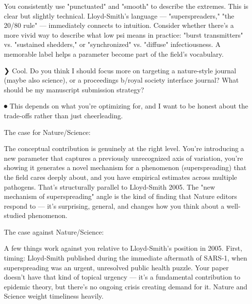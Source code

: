   You consistently use "punctuated" and "smooth" to describe the extremes. This is clear but slightly
   technical. Lloyd-Smith's language --- "superspreaders," "the 20/80 rule" --- immediately connects
  to intuition. Consider whether there's a more vivid way to describe what low psi means in practice:
   "burst transmitters" vs. "sustained shedders," or "synchronized" vs. "diffuse" infectiousness. A
  memorable label helps a parameter become part of the field's vocabulary.



































  ❯ Cool. Do you think I should focus more on targeting a nature-style journal (maybe also
  science), or a proceedings b/royal society interface journal? What should be my manuscript
  submission strategy?

⏺ This depends on what you're optimizing for, and I want to be honest about the trade-offs rather
  than just cheerleading.

  The case for Nature/Science:

  The conceptual contribution is genuinely at the right level. You're introducing a new parameter
  that captures a previously unrecognized axis of variation, you're showing it generates a novel
  mechanism for a phenomenon (superspreading) that the field cares deeply about, and you have
  empirical estimates across multiple pathogens. That's structurally parallel to Lloyd-Smith 2005.
  The "new mechanism of superspreading" angle is the kind of finding that Nature editors respond to
  --- it's surprising, general, and changes how you think about a well-studied phenomenon.

  The case against Nature/Science:

  A few things work against you relative to Lloyd-Smith's position in 2005. First, timing:
  Lloyd-Smith published during the immediate aftermath of SARS-1, when superspreading was an urgent,
  unresolved public health puzzle. Your paper doesn't have that kind of topical urgency --- it's a
  fundamental contribution to epidemic theory, but there's no ongoing crisis creating demand for it.
  Nature and Science weight timeliness heavily.

